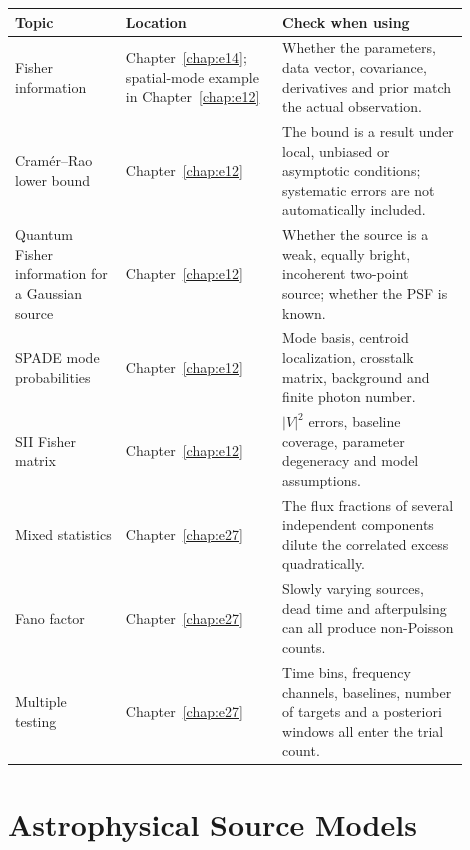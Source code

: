 \begin{longtable}{p{0.22\linewidth}p{0.31\linewidth}p{0.37\linewidth}}
\toprule
Topic & Location & Check when using \\
\midrule
Fisher information & Chapter~\ref{chap:e14}; spatial-mode example in Chapter~\ref{chap:e12} & Whether the parameters, data vector, covariance, derivatives and prior match the actual observation. \\
Cramér--Rao lower bound & Chapter~\ref{chap:e12} & The bound is a result under local, unbiased or asymptotic conditions; systematic errors are not automatically included. \\
Quantum Fisher information for a Gaussian source & Chapter~\ref{chap:e12} & Whether the source is a weak, equally bright, incoherent two-point source; whether the PSF is known. \\
SPADE mode probabilities & Chapter~\ref{chap:e12} & Mode basis, centroid localization, crosstalk matrix, background and finite photon number. \\
SII Fisher matrix & Chapter~\ref{chap:e12} & \(|V|^2\) errors, baseline coverage, parameter degeneracy and model assumptions. \\
Mixed statistics & Chapter~\ref{chap:e27} & The flux fractions of several independent components dilute the correlated excess quadratically. \\
Fano factor & Chapter~\ref{chap:e27} & Slowly varying sources, dead time and afterpulsing can all produce non-Poisson counts. \\
Multiple testing & Chapter~\ref{chap:e27} & Time bins, frequency channels, baselines, number of targets and a posteriori windows all enter the trial count. \\
\bottomrule
\end{longtable}

\section{Astrophysical Source Models}
\label{appsec:a-sources}

